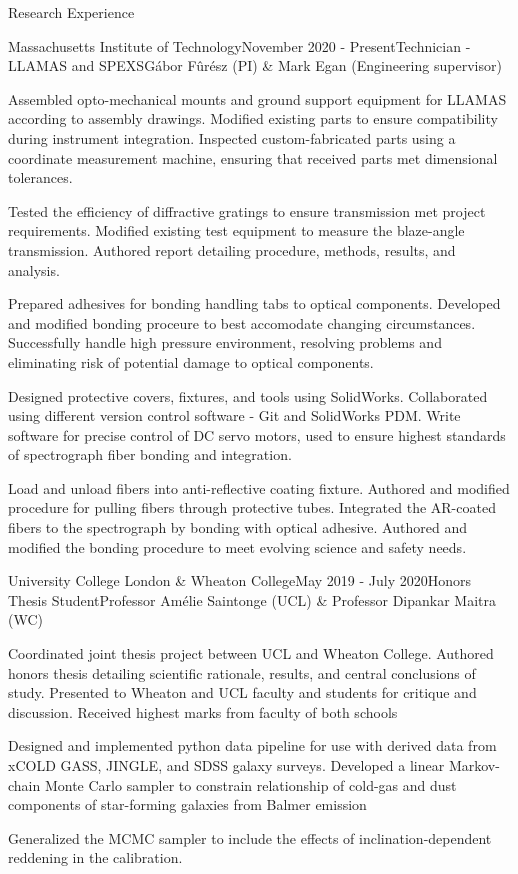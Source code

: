 \documentclass{resume} %
\begin{document}
\begin{rSection}{Research Experience}

\begin{rSubsection}{Massachusetts Institute of Technology}{November 2020 - Present}{Technician - LLAMAS and SPEXS}{G\'abor F\^ur\'esz (PI) \& Mark Egan (Engineering supervisor)}
\item Assembled opto-mechanical mounts and ground support equipment for LLAMAS according to assembly drawings. Modified existing parts to ensure compatibility during instrument integration. Inspected custom-fabricated parts using a coordinate measurement machine, ensuring that received parts met dimensional tolerances.
\item Tested the efficiency of diffractive gratings to ensure transmission met project requirements. Modified existing test equipment to measure the blaze-angle transmission. Authored report detailing procedure, methods, results, and analysis.
\item Prepared adhesives for bonding handling tabs to optical components. Developed and modified bonding proceure to best accomodate changing circumstances. Successfully handle high pressure environment, resolving problems and eliminating risk of potential damage to optical components.
\item Designed protective covers, fixtures, and tools using SolidWorks. Collaborated using different version control software - Git and SolidWorks PDM. Write software for precise control of DC servo motors, used to ensure highest standards of spectrograph fiber bonding and integration.
\item Load and unload fibers into anti-reflective coating fixture. Authored and modified procedure for pulling fibers through protective tubes. Integrated the AR-coated fibers to the spectrograph by bonding with optical adhesive. Authored and modified the bonding procedure to meet evolving science and safety needs.
\end{rSubsection}

\begin{rSubsection}{University College London \& Wheaton College}{May 2019 - July 2020}{Honors Thesis Student}{Professor Am\'{e}lie Saintonge (UCL) \& Professor Dipankar Maitra (WC)}
\item Coordinated joint thesis project between UCL and Wheaton College. Authored honors thesis detailing scientific rationale, results, and central conclusions of study. Presented to Wheaton and UCL faculty and students for critique and discussion. Received highest marks from faculty of both schools
\item Designed and implemented python data pipeline for use with derived data from xCOLD GASS, JINGLE, and SDSS galaxy surveys. Developed a linear Markov-chain Monte Carlo sampler to constrain relationship of cold-gas and dust components of star-forming galaxies from Balmer emission
\item Generalized the MCMC sampler to include the effects of inclination-dependent reddening in the calibration.
\end{rSubsection}


\end{rSection}
\end{document}
